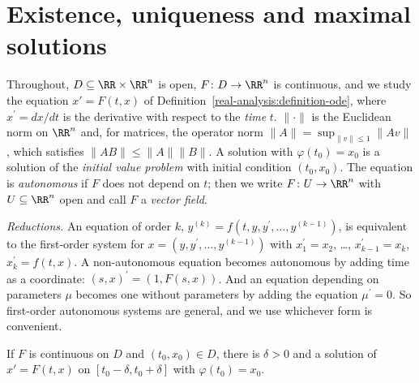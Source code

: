 \section{Existence, uniqueness and maximal solutions}\label{ordinary-differential-equations:section-ode}

\begin{notation}\label{ordinary-differential-equations:notation-ode}
Throughout, $D \subseteq \RR \times \RR^n$ is open, $F \colon D \to \RR^n$ is continuous, and we study the equation $x' = F(t, x)$ of Definition~\ref{real-analysis:definition-ode}, where $x^{\prime} = dx/dt$ is the derivative
with respect to the \emph{time} $t$. $\|\cdot\|$ is the Euclidean norm on $\RR^n$ and, for matrices, the operator norm $\|A\| = \sup_{\|v\| \leq 1}\|Av\|$, which satisfies $\|AB\| \leq \|A\|\|B\|$. A solution with
$\varphi(t_0) = x_0$ is a solution of the \emph{initial value problem} with initial condition $(t_0, x_0)$. The equation is \emph{autonomous} if $F$ does not depend on $t$; then we write $F \colon U \to \RR^n$ with $U \subseteq \RR^n$
open and call $F$ a \emph{vector field}.
\end{notation}

\emph{Reductions.} An equation of order $k$, $y^{(k)} = f(t, y, y^{\prime}, \ldots, y^{(k-1)})$, is equivalent to the first-order system for $x = (y, y^{\prime}, \ldots, y^{(k-1)})$ with $x_1^{\prime} = x_2$, \ldots, $x_{k-1}^{\prime} = x_k$,
$x_k^{\prime} = f(t, x)$. A non-autonomous equation becomes autonomous by adding time as a coordinate: $(s, x)^{\prime} = (1, F(s, x))$. And an equation depending on parameters $\mu$ becomes one without parameters by adding the
equation $\mu^{\prime} = 0$. So first-order autonomous systems are general, and we use whichever form is convenient.

\begin{theorem}[Peano]\label{ordinary-differential-equations:theorem-peano}
If $F$ is continuous on $D$ and $(t_0, x_0) \in D$, there is $\delta > 0$ and a solution of $x' = F(t, x)$ on $[t_0 - \delta, t_0 + \delta]$ with $\varphi(t_0) = x_0$.
\end{theorem}


